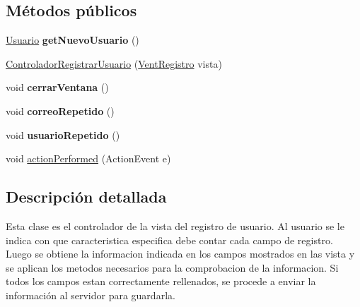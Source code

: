\subsection*{Métodos públicos}
\begin{DoxyCompactItemize}
\item 
\hypertarget{classcom_1_1ucab_1_1javachat_1_1_cliente_1_1controller_1_1_controlador_registrar_usuario_ae74c423df59d850fce66dc1ba049c563}{\hyperlink{classcom_1_1ucab_1_1javachat_1_1_cliente_1_1model_1_1_usuario}{Usuario} {\bfseries get\-Nuevo\-Usuario} ()}\label{classcom_1_1ucab_1_1javachat_1_1_cliente_1_1controller_1_1_controlador_registrar_usuario_ae74c423df59d850fce66dc1ba049c563}

\item 
\hyperlink{classcom_1_1ucab_1_1javachat_1_1_cliente_1_1controller_1_1_controlador_registrar_usuario_ac501d29a542346226190021b56b11288}{Controlador\-Registrar\-Usuario} (\hyperlink{classcom_1_1ucab_1_1javachat_1_1_cliente_1_1view_1_1_vent_registro}{Vent\-Registro} vista)
\item 
\hypertarget{classcom_1_1ucab_1_1javachat_1_1_cliente_1_1controller_1_1_controlador_registrar_usuario_a02bbff561df82eb06a129f6f12e33a35}{void {\bfseries cerrar\-Ventana} ()}\label{classcom_1_1ucab_1_1javachat_1_1_cliente_1_1controller_1_1_controlador_registrar_usuario_a02bbff561df82eb06a129f6f12e33a35}

\item 
\hypertarget{classcom_1_1ucab_1_1javachat_1_1_cliente_1_1controller_1_1_controlador_registrar_usuario_a803aeb4dc6e260ee0eb1be7e5603e088}{void {\bfseries correo\-Repetido} ()}\label{classcom_1_1ucab_1_1javachat_1_1_cliente_1_1controller_1_1_controlador_registrar_usuario_a803aeb4dc6e260ee0eb1be7e5603e088}

\item 
\hypertarget{classcom_1_1ucab_1_1javachat_1_1_cliente_1_1controller_1_1_controlador_registrar_usuario_a340270aa28a899021ee92469aad2e270}{void {\bfseries usuario\-Repetido} ()}\label{classcom_1_1ucab_1_1javachat_1_1_cliente_1_1controller_1_1_controlador_registrar_usuario_a340270aa28a899021ee92469aad2e270}

\item 
void \hyperlink{classcom_1_1ucab_1_1javachat_1_1_cliente_1_1controller_1_1_controlador_registrar_usuario_a45806ea9b7bbbc99883ecb5a521ecf3b}{action\-Performed} (Action\-Event e)
\end{DoxyCompactItemize}


\subsection{Descripción detallada}
Esta clase es el controlador de la vista del registro de usuario. Al usuario se le indica con que caracteristica especifica debe contar cada campo de registro. Luego se obtiene la informacion indicada en los campos mostrados en las vista y se aplican los metodos necesarios para la comprobacion de la informacion. Si todos los campos estan correctamente rellenados, se procede a enviar la información al servidor para guardarla.

